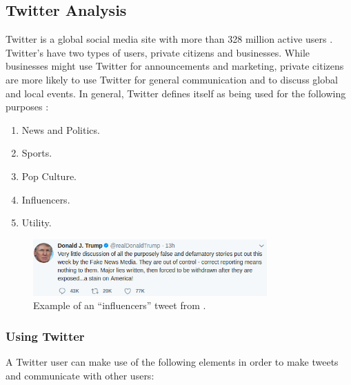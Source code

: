 \subsection{Twitter Analysis}\label{sec:twitter-analysis}
Twitter is a global social media site with more than 328 million active users
\citep{SocialMediaStats}. Twitter's have two types of users, private citizens
and businesses. While businesses might use Twitter for announcements and
marketing, private citizens are more likely to use Twitter for general
communication and to discuss global and local events. In general, Twitter
defines itself as being used for the following purposes \citep{StartingTwitter}:

\begin{enumerate}    
  \item News and Politics.
  \item Sports.
  \item Pop Culture. 
  \item Influencers.
  \item Utility.
\end{enumerate} 

\begin{figure}[H] 
	\centering 
	\includegraphics[width = 0.8\textwidth]{figures/DonDrumpf.png}
	\caption{Example of an ``influencers'' tweet from \@realDonaldTrump.}
	\label{fig:DrumpF}
\end{figure}

\subsubsection{Using Twitter}
A Twitter user can make use of the following elements \citep{StartingTwitter}
in order to make tweets and communicate with other users:

